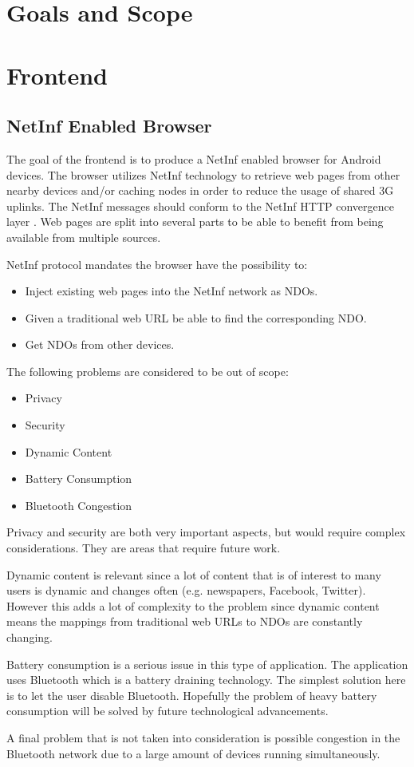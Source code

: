 \section{Goals and Scope}

\section{Frontend}

\subsection{NetInf Enabled Browser}

The goal of the frontend is to produce a NetInf enabled browser for Android devices. The browser utilizes NetInf technology to retrieve web pages from other nearby devices and/or caching nodes in order to reduce the usage of shared 3G uplinks. The NetInf messages should conform to the NetInf HTTP convergence layer \cite{netinfproto}. Web pages are split into several parts to be able to benefit from being available from multiple sources.

NetInf protocol mandates the browser have the possibility to:

\begin{itemize}
	\item Inject existing web pages into the NetInf network as NDOs.
	\item Given a traditional web URL be able to find the corresponding NDO.
	\item Get NDOs from other devices.
\end{itemize}

The following problems are considered to be out of scope:

\begin{itemize}
	\item Privacy
	\item Security
	\item Dynamic Content
	\item Battery Consumption
	\item Bluetooth Congestion
\end{itemize}

Privacy and security are both very important aspects, but would require complex considerations. They are areas that require future work.

Dynamic content is relevant since a lot of content that is of interest to many users is dynamic and changes often (e.g. newspapers, Facebook, Twitter). However this adds a lot of complexity to the problem since dynamic content means the mappings from traditional web URLs to NDOs are constantly changing.

Battery consumption is a serious issue in this type of application. The application uses Bluetooth which is a battery draining technology. The simplest solution here is to let the user disable Bluetooth. Hopefully the problem of heavy battery consumption will be solved by future technological advancements.

A final problem that is not taken into consideration is possible congestion in the Bluetooth network due to a large amount of devices running simultaneously.